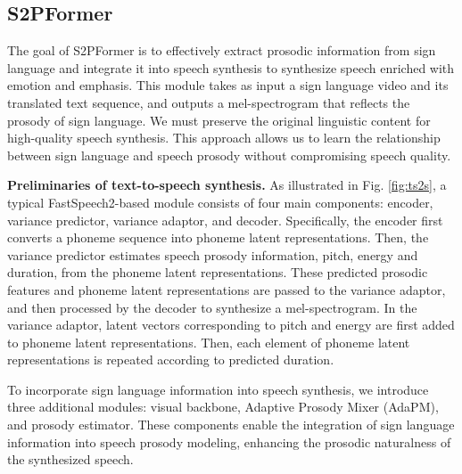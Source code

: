 \subsection{S2PFormer}
\label{sec:ts2s}
The goal of S2PFormer is to effectively extract prosodic information from sign language and integrate it into speech synthesis to synthesize speech enriched with emotion and emphasis.
This module takes as input a sign language video and its translated text sequence, 
and outputs a mel-spectrogram that reflects the prosody of sign language.
We must preserve the original linguistic content for high-quality speech synthesis. 
This approach allows us to learn the relationship between sign language and speech prosody without compromising speech quality.

\noindent
\textbf{Preliminaries of text-to-speech synthesis.}
As illustrated in Fig. \ref{fig:ts2s}, a typical FastSpeech2-based module consists of four main components: 
encoder, variance predictor, variance adaptor, and decoder.
Specifically, the encoder first converts a phoneme sequence into phoneme latent representations. 
Then, the variance predictor estimates speech prosody information, pitch, energy and duration, from the phoneme latent representations. 
These predicted prosodic features and phoneme latent representations are passed to the variance adaptor, 
and then processed by the decoder to synthesize a mel-spectrogram.
In the variance adaptor, latent vectors corresponding to pitch and energy are 
first added to phoneme latent representations. 
Then, each element of phoneme latent representations is repeated according to predicted duration.

To incorporate sign language information into speech synthesis, 
we introduce three additional modules: 
visual backbone, Adaptive Prosody Mixer (AdaPM), and prosody estimator.
These components enable the integration of sign language information into speech prosody modeling, enhancing the prosodic naturalness of the synthesized speech.

